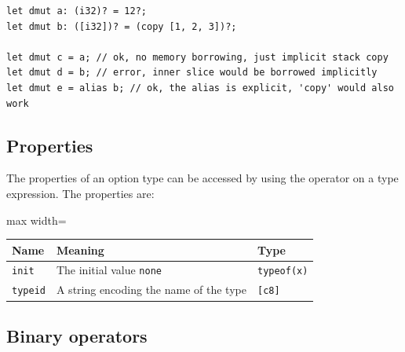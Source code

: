 \begin{lstlisting}[style=coloredverbatimError]
let dmut a: (i32)? = 12?;
let dmut b: ([i32])? = (copy [1, 2, 3])?;

let dmut c = a; // ok, no memory borrowing, just implicit stack copy
let dmut d = b; // error, inner slice would be borrowed implicitly
let dmut e = alias b; // ok, the alias is explicit, 'copy' would also work
\end{lstlisting}

\subsection{Properties}

The properties of an option type can be accessed by using the \token{::} operator on a type expression. The properties are:

\begin{center}\begin{adjustbox}{max width=\linewidth}
  \begin{tabular}{|l|ll|}
    \hline
    Name & Meaning & Type\\
    \hline
    \hline
    \texttt{init} & The initial value \texttt{none} & \texttt{typeof(x)}\\
    \hline
    \texttt{typeid} & A string encoding the name of the type & \texttt{[c8]} \\
    \hline
  \end{tabular}
\end{adjustbox}\end{center}

\subsection{Binary operators}

